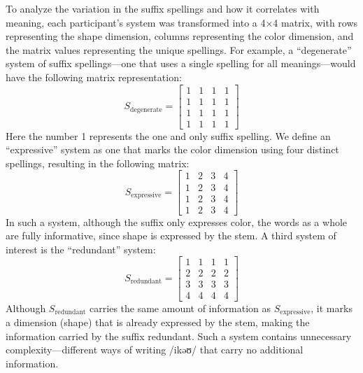 \documentclass[doc,biblatex]{apa7}
\begin{document}
To analyze the variation in the suffix spellings and how it correlates with meaning, each participant's system was transformed into a 4×4 matrix, with rows representing the shape dimension, columns representing the color dimension, and the matrix values representing the unique spellings. For example, a ``degenerate'' system of suffix spellings---one that uses a single spelling for all meanings---would have the following matrix representation:
\begin{equation}
	S_\mathrm{degenerate} = \begin{bmatrix}
	1 & 1 & 1 & 1 \\
	1 & 1 & 1 & 1 \\
	1 & 1 & 1 & 1 \\
	1 & 1 & 1 & 1
	\end{bmatrix}
\end{equation}
Here the number 1 represents the one and only suffix spelling. We define an ``expressive'' system as one that marks the color dimension using four distinct spellings, resulting in the following matrix:
\begin{equation}
	S_\mathrm{expressive} = \begin{bmatrix}
	1 & 2 & 3 & 4 \\
	1 & 2 & 3 & 4 \\
	1 & 2 & 3 & 4 \\
	1 & 2 & 3 & 4
	\end{bmatrix}
\end{equation}
In such a system, although the suffix only expresses color, the words as a whole are fully informative, since shape is expressed by the stem. A third system of interest is the ``redundant'' system:
\begin{equation}
	S_\mathrm{redundant} = \begin{bmatrix}
	1 & 1 & 1 & 1 \\
	2 & 2 & 2 & 2 \\
	3 & 3 & 3 & 3 \\
	4 & 4 & 4 & 4
	\end{bmatrix}
\end{equation}
Although $S_\mathrm{redundant}$ carries the same amount of information as $S_\mathrm{expressive}$, it marks a dimension (shape) that is already expressed by the stem, making the information carried by the suffix redundant. Such a system contains unnecessary complexity---different ways of writing /ikəʊ/ that carry no additional information.
\end{document}
